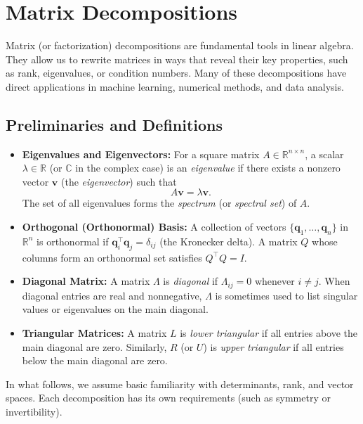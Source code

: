 \section{Matrix Decompositions}
Matrix (or factorization) decompositions are fundamental tools in linear algebra. 
They allow us to rewrite matrices in ways that reveal their key properties, 
such as rank, eigenvalues, or condition numbers. Many of these decompositions 
have direct applications in machine learning, numerical methods, and data analysis.

\subsection{Preliminaries and Definitions}
\begin{itemize}
    \item \textbf{Eigenvalues and Eigenvectors:}
          For a square matrix $A \in \mathbb{R}^{n \times n}$, 
          a scalar $\lambda \in \mathbb{R}$ (or $\mathbb{C}$ in the complex case) is an \emph{eigenvalue} 
          if there exists a nonzero vector $\mathbf{v}$ (the \emph{eigenvector}) such that
          \[
            A \mathbf{v} = \lambda \mathbf{v}.
          \]
          The set of all eigenvalues forms the \emph{spectrum} (or \emph{spectral set}) of $A$.

    \item \textbf{Orthogonal (Orthonormal) Basis:}
          A collection of vectors $\{\mathbf{q}_1, \ldots, \mathbf{q}_n\}$ in $\mathbb{R}^n$ 
          is orthonormal if $\mathbf{q}_i^\top \mathbf{q}_j = \delta_{ij}$ (the Kronecker delta). 
          A matrix $Q$ whose columns form an orthonormal set satisfies $Q^\top Q = I$.

    \item \textbf{Diagonal Matrix:}
          A matrix $\Lambda$ is \emph{diagonal} if $\Lambda_{ij} = 0$ whenever $i \neq j$. 
          When diagonal entries are real and nonnegative, $\Lambda$ is sometimes used to list singular values 
          or eigenvalues on the main diagonal.

    \item \textbf{Triangular Matrices:}
          A matrix $L$ is \emph{lower triangular} if all entries above the main diagonal are zero. 
          Similarly, $R$ (or $U$) is \emph{upper triangular} if all entries below the main diagonal are zero.
\end{itemize}

\noindent
In what follows, we assume basic familiarity with determinants, rank, and vector spaces. 
Each decomposition has its own requirements (such as symmetry or invertibility). 


